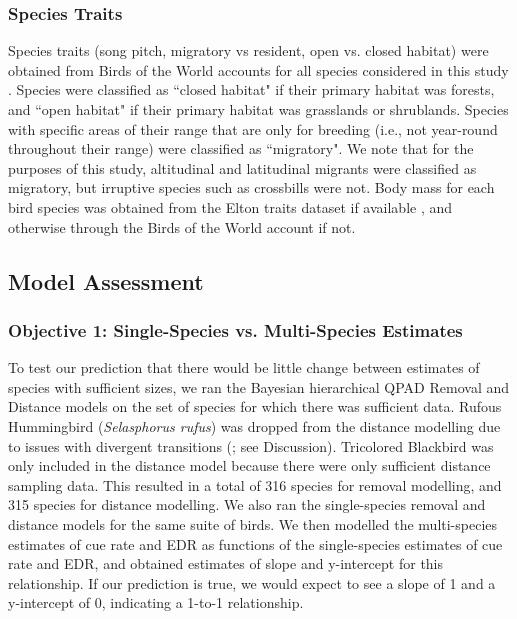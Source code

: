 \documentclass[12pt]{article}
\begin{document}
\subsubsection{Species Traits}
\par Species traits (song pitch, migratory vs resident, open vs. closed habitat) were obtained from Birds of the World accounts for all species considered in this study \citep{billerman_birds_2022}. 
Species were classified as ``closed habitat" if their primary habitat was forests, and ``open habitat" if their primary habitat was grasslands or shrublands.
Species with specific areas of their range that are only for breeding (i.e., not year-round throughout their range) were classified as ``migratory".
We note that for the purposes of this study, altitudinal and latitudinal migrants were classified as migratory, but irruptive species such as crossbills were not.
Body mass for each bird species was obtained from the Elton traits dataset if available \citep{wilman_eltontraits_2014}, and otherwise through the Birds of the World account \citep{billerman_birds_2022} if not.


\subsection{Model Assessment}
\subsubsection{Objective 1: Single-Species vs. Multi-Species Estimates}
\par To test our prediction that there would be little change between estimates of species with sufficient sizes, we ran the Bayesian hierarchical QPAD Removal and Distance models on the set of species for which there was sufficient data.
Rufous Hummingbird (\textit{Selasphorus rufus}) was dropped from the distance modelling due to issues with divergent transitions (\citet{betancourt_diagnosing_2016, leimkuhler_simulating_2005}; see Discussion).
Tricolored Blackbird was only included in the distance model because there were only sufficient distance sampling data.
This resulted in a total of 316 species for removal modelling, and 315 species for distance modelling.
We also ran the single-species removal and distance models for the same suite of birds.
We then modelled the multi-species estimates of cue rate and EDR as functions of the single-species estimates of cue rate and EDR, and obtained estimates of slope and y-intercept for this relationship.
If our prediction is true, we would expect to see a slope of 1 and a y-intercept of 0, indicating a 1-to-1 relationship.
\end{document}
